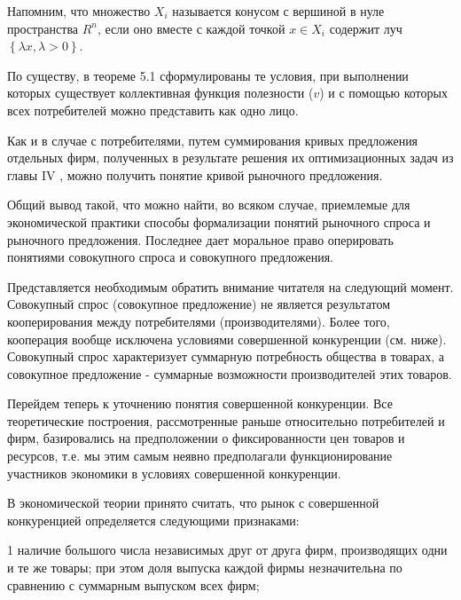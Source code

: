 \documentclass[12pt, 4paper]{book}
\begin{document}
{Напомним, что множество $X_i$ называется конусом с вершиной в нуле пространства $R^{n}$, если оно вместе с каждой точкой $x \in X_i$ содержит луч $\left\{ \lambda x,\lambda >0 \right\}$.
\par

По существу, в теореме 5.1 сформулированы те условия, при выполнении которых существует коллективная функция полезности ($v$) и с помощью которых всех потребителей можно представить как одно лицо.
\par

Как и в случае с потребителями, путем суммирования кривых предложения отдельных фирм, полученных в результате решения их оптимизационных задач из главы IV , можно получить понятие кривой рыночного предложения.
\par

Общий вывод такой, что можно найти, во всяком случае, приемлемые для экономической практики способы формализации понятий рыночного спроса и рыночного предложения. Последнее дает моральное право оперировать понятиями совокупного спроса и совокупного предложения.
\par

Представляется необходимым обратить внимание читателя на следующий момент. Совокупный спрос (совокупное предложение) не является результатом кооперирования между потребителями (производителями). Более того, кооперация вообще исключена условиями совершенной конкуренции (см. ниже). Совокупный спрос характеризует суммарную потребность общества в товарах, а совокупное предложение - суммарные возможности производителей этих товаров.
\par

Перейдем теперь к уточнению понятия совершенной конкуренции. Все теоретические построения, рассмотренные раньше относительно потребителей и фирм, базировались на предположении о фиксированности цен товаров и ресурсов, т.е. мы этим самым неявно предполагали функционирование участников экономики в условиях совершенной конкуренции.
\par

В экономической теории принято считать, что рынок с совершенной конкуренцией определяется следующими признаками:
\par

1 наличие большого числа независимых друг от друга фирм, производящих одни и те же товары; при этом доля выпуска каждой фирмы незначительна по сравнению с суммарным выпуском всех фирм;
\par

}
\end{document}
